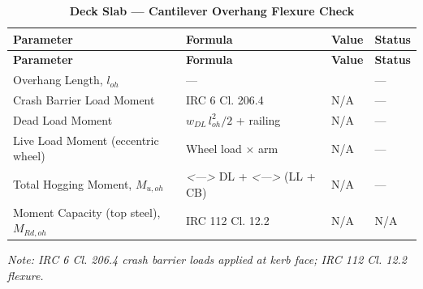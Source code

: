 \documentclass[12pt,a4paper]{report}
\numberwithin{table}{chapter}
\numberwithin{figure}{chapter}
\newcommand{\reportrowpad}{4pt}
\newcommand{\reportsectiongap}{0.75em}
\newcommand{\placeholder}[1]{\textit{\textless #1\textgreater}}
\begin{document}
\vspace{\reportsectiongap}
\begin{longtable}{|L{5.5cm}|C{3.5cm}|>{\centering\arraybackslash}p{4.5cm}|C{2cm}|}
\caption{\textbf{Deck Slab --- Cantilever Overhang Flexure Check}}\\
\hline
\textbf{Parameter} & \textbf{Formula} & \textbf{Value} & \textbf{Status} \\[\reportrowpad]
\hline
\endfirsthead
\hline
\textbf{Parameter} & \textbf{Formula} & \textbf{Value} & \textbf{Status} \\[\reportrowpad]
\hline
\endhead
Overhang Length, $l_{oh}$ & --- &  & --- \\[\reportrowpad]
\hline
Crash Barrier Load Moment & IRC 6 Cl. 206.4 & N/A & --- \\[\reportrowpad]
\hline
Dead Load Moment & $w_{DL}\,l_{oh}^2/2$ + railing & N/A & --- \\[\reportrowpad]
\hline
Live Load Moment (eccentric wheel) & Wheel load $\times$ arm & N/A & --- \\[\reportrowpad]
\hline
Total Hogging Moment, $M_{u,oh}$ & \placeholder{---} DL + \placeholder{---} (LL + CB) & N/A & --- \\[\reportrowpad]
\hline
Moment Capacity (top steel), $M_{Rd,oh}$ & IRC 112 Cl. 12.2 & N/A & N/A \\[\reportrowpad]
\hline
\end{longtable}
\noindent\textit{Note: IRC 6 Cl. 206.4 crash barrier loads applied at kerb face; IRC 112 Cl. 12.2 flexure.}
\end{document}
